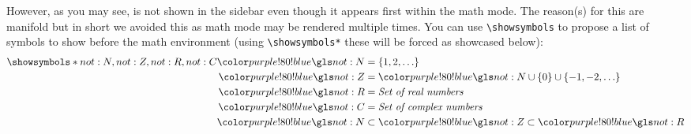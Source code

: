 However, as you may see,  is not shown in the sidebar even though it appears first within the math mode. The reason(s) for this are manifold but in short we avoided this as math mode may be rendered multiple times. 
You can use \texttt{\textbackslash showsymbols} to propose a list of symbols to show before the math environment (using \texttt{\textbackslash showsymbols*} these will be forced as showcased below):
\begin{align}
   \showsymbols*{not:N,not:Z,not:R,not:C}
   \glssym{not:N} &= \{1, 2, \ldots\} \\
   \glssym{not:Z} &= \glssym{not:N} \cup \{0\} \cup \{-1, -2, \ldots\} \\
   \glssym{not:R} &= \textit{Set of real numbers} \\
   \glssym{not:C} &= \textit{Set of complex numbers} \\
   \glssym{not:N} &\subset \glssym{not:Z} \subset \glssym{not:R} %
\end{align}

